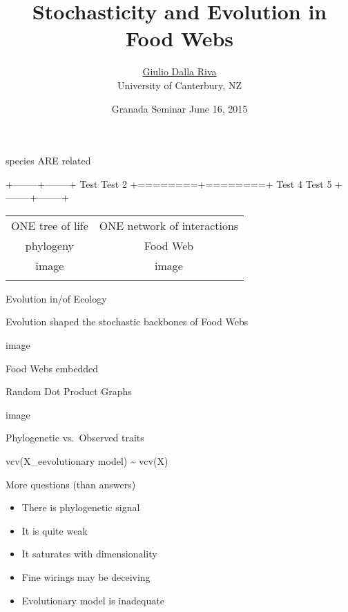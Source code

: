 \documentclass[ignorenonframetext,]{beamer}
\title{Stochasticity and Evolution in Food Webs}
\author{\href{http://gvdr.github.io}{Giulio Dalla Riva}\\ University of
Canterbury, NZ}
\date{Granada Seminar June 16, 2015}
\begin{document}
\frame{\titlepage}

\begin{frame}{species ARE related}

+--------+--------+ \textbar{} Test \textbar{} Test 2 \textbar{}
+========+========+ \textbar{} Test 4 \textbar{} Test 5 \textbar{}
+--------+--------+

\begin{longtable}[c]{@{}cc@{}}
\toprule\addlinespace
ONE tree of life & ONE network of interactions
\\\addlinespace
\midrule\endhead
phylogeny & Food Web
\\\addlinespace
image & image
\\\addlinespace
\bottomrule
\end{longtable}

\end{frame}

\begin{frame}{Evolution in/of Ecology}

Evolution shaped the stochastic backbones of Food Webs

image

\end{frame}

\begin{frame}{Food Webs embedded}

\begin{block}{Random Dot Product Graphs}

image

\end{block}

\begin{block}{Phylogenetic vs.~Observed traits}

vcv(X\_e\textbar{}evolutionary model) \textasciitilde{} vcv(X)

\end{block}

\end{frame}

\begin{frame}{More questions (than answers)}

\begin{itemize}[<+->]
\itemsep1pt\parskip0pt
\item
  There is phylogenetic signal
\item
  It is quite weak
\item
  It saturates with dimensionality
\item
  Fine wirings may be deceiving
\item
  Evolutionary model is inadequate
\end{itemize}

\end{frame}
\end{document}
